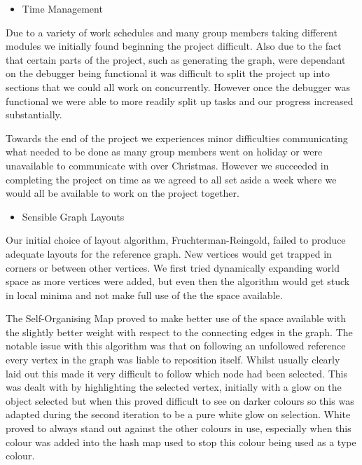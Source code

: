 \documentclass[11pt, a4paper]{report}
\begin{document}
\begin{itemize}
  \item Time Management
\end{itemize}

Due to a variety of work schedules and many group members taking different modules we initially found beginning the project difficult. Also due to the fact that certain parts of the project, such as generating the graph, were dependant on the debugger being functional it was difficult to split the project up into sections that we could all work on concurrently. However once the debugger was functional we were able to more readily split up tasks and our progress increased substantially.

Towards the end of the project we experiences minor difficulties communicating what needed to be done as many group members went on holiday or were unavailable to communicate with over Christmas. However we succeeded in completing the project on time as we agreed to all set aside a week where we would all be available to work on the project together.

\begin{itemize}
  \item Sensible Graph Layouts
\end{itemize}

Our initial choice of layout algorithm, Fruchterman-Reingold, failed to produce adequate layouts for the reference graph. New vertices would get trapped in corners or between other vertices. We first tried dynamically expanding world space as more vertices were added, but even then the algorithm would get stuck in local minima and not make full use of the the space available. 

The Self-Organising Map proved to make better use of the space available with the slightly better weight with respect to the connecting edges in the graph. The notable issue with this algorithm was that on following an unfollowed reference every vertex in the graph was liable to reposition itself. Whilst usually clearly laid out this made it very difficult to follow which node had been selected. This was dealt with by highlighting the selected vertex, initially with a glow on the object selected but when this proved difficult to see on darker colours so this was adapted during the second iteration to be a pure white glow on selection. White proved to always stand out against the other colours in use, especially when this colour was added into the hash map used to stop this colour being used as a type colour.
\end{document}
